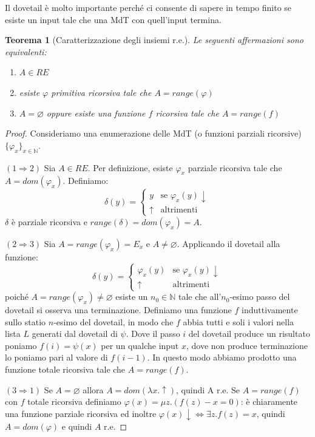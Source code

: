 \documentclass[a4paper,titlepage]{article}
\newtheorem{theorem}{Teorema}[section]
\theoremstyle{definition}
\newcommand{\N}{\mathbb{N}}
\begin{document}
Il dovetail è molto importante perché ci consente di sapere in tempo finito se esiste un input tale che una MdT con quell'input termina. 
\begin{theorem}[Caratterizzazione degli insiemi r.e.]
	Le seguenti affermazioni sono equivalenti:
	\begin{enumerate}[(1)]
		\item $A\in RE$
		\item esiste $\varphi$ primitiva ricorsiva tale che $A=range(\varphi)$
		\item $A=\varnothing$ oppure esiste una funzione $f$ ricorsiva tale che $A=range(f)$
	\end{enumerate}
\end{theorem}

\begin{proof}
	Consideriamo una enumerazione delle MdT (o funzioni parziali ricorsive) $\{\varphi_x\}_{x\in\N}$. 
	
	$(1\Rightarrow 2)$ Sia $A\in RE$. Per definizione, esiste $\varphi_x$ parziale ricorsiva tale che $A=dom(\varphi_x)$. Definiamo:
	\[
		\delta(y) =
		\begin{cases}
			y &\text{se } \varphi_x(y)\downarrow\\
			\uparrow &\text{altrimenti}
		\end{cases}
	\]
	$\delta$ è parziale ricorsiva e $range(\delta)=dom(\varphi_x)=A$.
	
	$(2\Rightarrow 3)$ Sia $A=range(\varphi_x)=E_x$ e $A\neq\varnothing$. Applicando il dovetail alla funzione:
	\[
		\delta(y) =
		\begin{cases}
			\varphi_x(y) &\text{se } \varphi_x(y)\downarrow\\
			\uparrow &\text{altrimenti}
		\end{cases}
	\]
	poiché $A=range(\varphi_x)\neq\varnothing$ esiste un $n_0\in\N$ tale che all'$n_0$-esimo passo del dovetail si osserva una terminazione. Definiamo una funzione $f$ induttivamente sullo statio $n$-esimo del dovetail, in modo che $f$ abbia tutti e soli i valori nella lista $L$ generati dal dovetail di $\psi$. Dove il passo $i$ del dovetail produce un risultato poniamo $f(i)=\psi(x)$ per un qualche input $x$, dove non produce terminazione lo poniamo pari al valore di $f(i-1)$. In questo modo abbiamo prodotto una funzione totale ricorsiva tale che $A=range(f)$.
	
	$(3\Rightarrow 1)$ Se $A=\varnothing$ allora $A=dom(\lambda x.\uparrow)$, quindi A r.e. Se $A=range(f)$ con $f$ totale ricorsiva definiamo $\varphi(x)=\mu z.(f(z)-x = 0)$: è chiaramente una funzione parziale ricorsiva ed inoltre $\varphi(x)\downarrow\iff\exists z.f(z)=x$, quindi $A=dom(\varphi)$ e quindi $A$ r.e.
\end{proof}
\end{document}
